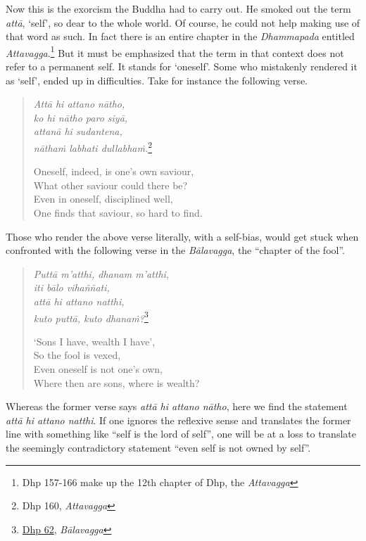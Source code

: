 Now this is the exorcism the Buddha had to carry out. He smoked out the term \emph{attā}, `self', so dear to the whole world. Of course, he could not help making use of that word as such. In fact there is an entire chapter in the \emph{Dhammapada} entitled \emph{Attavagga}.\footnote{Dhp 157-166 make up the 12th chapter of Dhp, the \emph{Attavagga}} But it must be emphasized that the term in that context does not refer to a permanent self. It stands for `oneself'. Some who mistakenly rendered it as `self', ended up in difficulties. Take for instance the following verse.

\begin{quote}
\emph{Attā hi attano nātho,}\\
\emph{ko hi nātho paro siyā,}\\
\emph{attanā hi sudantena,}\\
\emph{nāthaṁ labhati dullabhaṁ.}\footnote{Dhp 160, \emph{Attavagga}}

Oneself, indeed, is one's own saviour,\\
What other saviour could there be?\\
Even in oneself, disciplined well,\\
One finds that saviour, so hard to find.
\end{quote}

Those who render the above verse literally, with a self-bias, would get stuck when confronted with the following verse in the \emph{Bālavagga}, the ``chapter of the fool''.

\begin{quote}
\emph{Puttā m'atthi, dhanam m'atthi,}\\
\emph{iti bālo vihaññati,}\\
\emph{attā hi attano natthi,}\\
\emph{kuto puttā, kuto dhanaṁ?}\footnote{\href{https://suttacentral.net/dhp60-75/pli/ms}{Dhp 62}, \emph{Bālavagga}}

`Sons I have, wealth I have',\\
So the fool is vexed,\\
Even oneself is not one's own,\\
Where then are sons, where is wealth?
\end{quote}

Whereas the former verse says \emph{attā hi attano nātho}, here we find the statement \emph{attā hi attano natthi}. If one ignores the reflexive sense and translates the former line with something like ``self is the lord of self'', one will be at a loss to translate the seemingly contradictory statement ``even self is not owned by self''.

